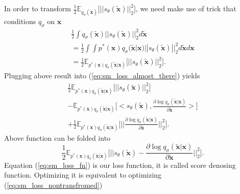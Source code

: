 \documentclass[10pt]{article}
\begin{document}
In order to transform $ \frac{1}{2} \mathbb{E}_{q_{\sigma}( \tilde{\textbf{x}} ) } \Big[ ||  s_{\theta}(\tilde{\textbf{x}})||_2^2 \Big]$, we need make use of trick that conditions $q_{\sigma} $ on $\textbf{x}$ 
\begin{gather}
    \frac{1}{2}\int q_{\sigma}( \tilde{\textbf{x}} )  ||  s_{\theta}(\tilde{\textbf{x}})||_2^2 d\tilde{\textbf{x}} \\ 
    =    \frac{1}{2} \int \int  p^*(\textbf{x})q_{\sigma}( \tilde{\textbf{x}} | \textbf{x} ) 
    ||  s_{\theta}(\tilde{\textbf{x}})||_2^2 d\tilde{\textbf{x}} d \textbf{x} \\
    = \frac{1}{2} \mathbb{E}_{p^*(\textbf{x})q_{\sigma}( \tilde{\textbf{x}} | \textbf{x} )  }
    \Big[ ||  s_{\theta}(\tilde{\textbf{x}})||_2^2 \Big].
\end{gather}
Plugging above result into (\ref{eq:sm_loss_almost_there}) yields
\begin{equation}
\begin{gathered}
     \frac{1}{2} \mathbb{E}_{p^*(\textbf{x})q_{\sigma}( \tilde{\textbf{x}} | \textbf{x} )  }
    \Big[ ||  s_{\theta}(\tilde{\textbf{x}})||_2^2 \Big] \\
    - \mathbb{E}_{ p^*(\textbf{x} )  q_{\sigma}(\tilde{\textbf{x}} | \textbf{x}) }
    \Big[
    < s_{\theta}(\tilde{\textbf{x}}),  \frac{\partial \log q_{\sigma}(\tilde{\textbf{x}} | \textbf{x})}  {\partial \tilde{\textbf{x}}} > 
    \Big] \\
    + \frac{1}{2}\mathbb{E}_{ p^*(\textbf{x} )  q_{\sigma}(\tilde{\textbf{x}} | \textbf{x}) }
\Big[ || \frac{\partial \log q_{\sigma}(\tilde{\textbf{x}} | \textbf{x})}  {\partial \tilde{\textbf{x}}}||_2^2 \Big].
\end{gathered}
\end{equation}
Above function can be folded into
\begin{equation}
\label{eq:sm_loss_fn}
      \frac{1}{2} \mathbb{E}_{p^*(\textbf{x})q_{\sigma}( \tilde{\textbf{x}} | \textbf{x} )  }
    \Big[ ||  s_{\theta}(\tilde{\textbf{x}})  - 
    \frac{\partial \log q_{\sigma}(\tilde{\textbf{x}} | \textbf{x})}  {\partial \tilde{\textbf{x}}} ||_2^2 \Big].
\end{equation}
Equation (\ref{eq:sm_loss_fn}) is our loss function, it is called score denosing function. Optimizing it is equivalent to optimizing (\ref{eq:sm_loss_nontransfromed})
\end{document}
